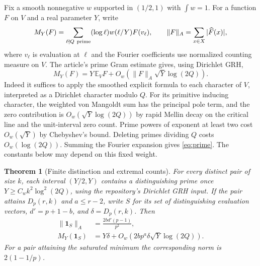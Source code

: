 \documentclass[11pt,letterpaper]{article}
\newtheorem{theorem}{Theorem}[section]
\theoremstyle{remark}
\begin{document}
Fix a smooth nonnegative $w$ supported in $(1/2,1)$ with
$\int w=1$. For a function $F$ on $V$ and a real parameter $Y$, write
\[
 M_Y(F)=\sum_{\ell\nmid Q\ {\rm prime}}(\log\ell)w(\ell/Y)F(v_\ell),
 \qquad
 \|F\|_{A}=\sum_{x\in X}|\widehat F(x)|,
\]
where $v_\ell$ is evaluation at $\ell$ and the Fourier coefficients
use normalized counting measure on $V$. The article's prime Gram
estimate gives, using Dirichlet GRH, 
\begin{equation}\label{eq:prime}
 M_Y(F)=Y\,\mathbb E_V F+O_w\!\left(\|F\|_A\sqrt Y\log(2Q)\right).
\end{equation}
Indeed it suffices to apply the smoothed explicit formula to each
character of $V$, interpreted as a Dirichlet character modulo $Q$.
For its primitive inducing character, the weighted von Mangoldt sum
has the principal pole term, and the zero contribution is
$O_w(\sqrt Y\log(2Q))$ by rapid Mellin decay on the critical line and
the unit-interval zero count. Prime powers of exponent at least two
cost $O_w(\sqrt Y)$ by Chebyshev's bound. Deleting primes dividing $Q$
costs $O_w(\log(2Q))$. Summing the Fourier expansion gives
\eqref{eq:prime}. The constants below may depend on this fixed weight.

\begin{theorem}[Finite distinction and extremal counts]\label{thm:window}
For every distinct pair of size $k$, each interval $(Y/2,Y)$ contains a
distinguishing prime once $Y\ge C_w k^2\log^2(2Q)$, using the repository's
Dirichlet GRH input. If the pair attains $D_p(r,k)$ and $a\le r-2$,
write $S$ for its set of distinguishing evaluation vectors, $d'=p+1-b$,
and $\delta=D_p(r,k)$. Then
\begin{align}
 \|\mathbf1_S\|_A &= \frac{2b d'(p-1)}{p^2},\label{eq:exactnorm}\\
 M_Y(\mathbf1_S)&=Y\delta+
 O_w\!\left(2bp^a\delta\sqrt Y\log(2Q)\right).\label{eq:window}
\end{align}
For a pair attaining the saturated minimum the corresponding norm
is $2(1-1/p)$.
\end{theorem}
\end{document}
